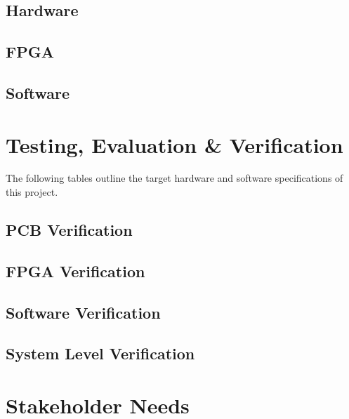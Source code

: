 \documentclass[letterpaper,12pt]{article}
\begin{document}

\subsection{Hardware} %
\subsection{FPGA} %
\subsection{Software} %

\section{Testing, Evaluation \& Verification}
The following tables outline the target hardware and software specifications of
this project.
\subsection{PCB Verification} %
\subsection{FPGA Verification} %
\subsection{Software Verification} %
\subsection{System Level Verification} %

\section{Stakeholder Needs} %
\end{document}
